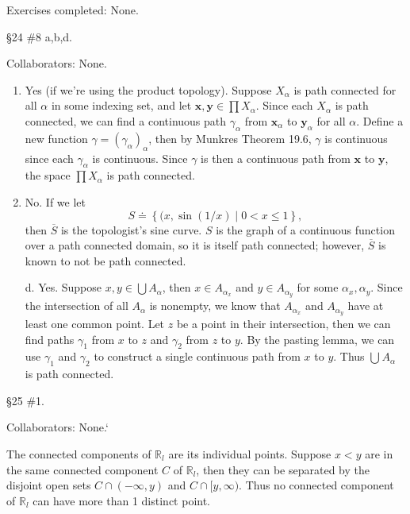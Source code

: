 \documentclass[10pt]{report}
\begin{document}

\renewcommand{\theenumi}{\alph{enumi}}

{\color{blue}Exercises completed: None.}

\begin{exer}[]
\S 24 \#8 a,b,d.
\end{exer}
{\color{blue}Collaborators: None.}

\begin{enumerate}
	\item Yes (if we're using the product topology). Suppose $X_{\alpha}$ is path connected for all $\alpha$ in some indexing set, and let $\mathbf{x},\mathbf{y} \in \prod X_{\alpha}$. Since each $X_{\alpha}$ is path connected, we can find a continuous path $\gamma_{\alpha}$ from $\mathbf{x}_{\alpha}$ to $\mathbf{y}_{\alpha}$ for all $\alpha$. Define a new function $\gamma = (\gamma_{\alpha})_{\alpha}$, then by Munkres Theorem 19.6, $\gamma$ is continuous since each $\gamma_{\alpha}$ is continuous. Since $\gamma$ is then a continuous path from $\mathbf{x}$ to $\mathbf{y}$, the space $\prod X_{\alpha}$ is path connected.
	
	\item No. If we let
		\[
			S \doteq \left\{ (x,\sin(1/x) \;|\; 0 < x \leq 1 \right\},
		\] then $\overline{S}$ is the topologist's sine curve. $S$ is the graph of a continuous function over a path connected domain, so it is itself path connected; however, $\overline{S}$ is known to not be path connected.

	\item[d.] Yes. Suppose $x,y \in \bigcup A_{\alpha}$, then $x \in A_{\alpha_x}$ and $y \in A_{\alpha_y}$ for some $\alpha_x,\alpha_y$. Since the intersection of all $A_{\alpha}$ is nonempty, we know that $A_{\alpha_x}$ and $A_{\alpha_y}$ have at least one common point. Let $z$ be a point in their intersection, then we can find paths $\gamma_1$ from $x$ to $z$ and $\gamma_2$ from $z$ to $y$. By the pasting lemma, we can use $\gamma_1$ and $\gamma_2$ to construct a single continuous path from $x$ to $y$. Thus $\bigcup_{}A_{\alpha}$ is path connected.
\end{enumerate}

\begin{exer}[]
\S 25 \#1.
\end{exer}
{\color{blue}Collaborators: None.}`

The connected components of $\mathbb{R}_{l}$ are its individual points. Suppose $x < y$ are in the same connected component $C$ of $\mathbb{R}_l$, then they can be separated by the disjoint open sets $C \cap (-\infty,y)$ and $C \cap [y,\infty)$. Thus no connected component of $\mathbb{R}_l$ can have more than 1 distinct point.
\end{document}
